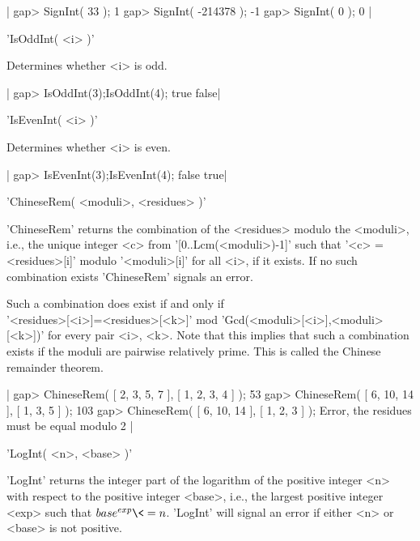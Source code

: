 |    gap> SignInt( 33 );
    1
    gap> SignInt( -214378 );
    -1
    gap> SignInt( 0 );
    0 |

%

'IsOddInt( <i> )'

Determines whether <i> is odd.

|    gap> IsOddInt(3);IsOddInt(4);
     true
     false|

%

'IsEvenInt( <i> )'

Determines whether <i> is even.

|    gap> IsEvenInt(3);IsEvenInt(4);
     false
     true|

%

'ChineseRem( <moduli>, <residues> )'

'ChineseRem' returns the combination   of   the  <residues>  modulo   the
<moduli>, i.e., the  unique integer <c>  from '[0..Lcm(<moduli>)-1]' such
that  '<c>  = <residues>[i]' modulo '<moduli>[i]'   for  all  <i>, if  it
exists.  If no such combination exists 'ChineseRem' signals an error.

Such    a    combination    does     exist    if    and     only     if\\
'<residues>[<i>]=<residues>[<k>]'  mod 'Gcd(<moduli>[<i>],<moduli>[<k>])'
for every pair <i>, <k>.  Note  that this implies that such a combination
exists if the  moduli  are pairwise relatively prime.  This is called the
Chinese remainder theorem.

|    gap> ChineseRem( [ 2, 3, 5, 7 ], [ 1, 2, 3, 4 ] );
    53
    gap> ChineseRem( [ 6, 10, 14 ], [ 1, 3, 5 ] );
    103
    gap> ChineseRem( [ 6, 10, 14 ], [ 1, 2, 3 ] );
    Error, the residues must be equal modulo 2 |

%

'LogInt( <n>, <base> )'

'LogInt'   returns  the  integer part  of  the logarithm of  the positive
integer  <n> with  respect to   the positive integer   <base>, i.e.,  the
largest  positive integer <exp> such  that $base^{exp}  \<= n$.  'LogInt'
will signal an error if either <n> or <base> is not positive.

